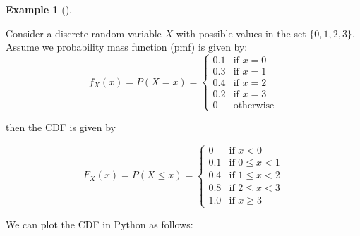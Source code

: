 \documentclass[
  letterpaper,
  DIV=11,
  numbers=noendperiod]{scrreport}
\theoremstyle{definition}
\newtheorem{example}{Example}[chapter]
\theoremstyle{plain}
\theoremstyle{plain}
\theoremstyle{definition}
\theoremstyle{remark}
\begin{document}
\begin{tcolorbox}[enhanced jigsaw, opacitybacktitle=0.6, bottomtitle=1mm, opacityback=0, toprule=.15mm, colbacktitle=quarto-callout-note-color!10!white, colback=white, left=2mm, title={CDF of a discrete random variable}, breakable, rightrule=.15mm, leftrule=.75mm, titlerule=0mm, colframe=quarto-callout-note-color-frame, arc=.35mm, coltitle=black, toptitle=1mm, bottomrule=.15mm]

\begin{example}[]\protect\hypertarget{exm-cdf-discrete}{}\label{exm-cdf-discrete}

Consider a discrete random variable \(X\) with possible values in the
set \(\{0, 1, 2, 3\}\). Assume we probability mass function (pmf) is
given by: \[
f_X(x) = P(X=x) =
\begin{cases}
0.1 & \text{if } x = 0 \\
0.3 & \text{if } x = 1 \\
0.4 & \text{if } x = 2 \\
0.2 & \text{if } x = 3 \\
0 & \text{otherwise}
\end{cases}
\]

then the CDF is given by

\[
F_X(x) = P(X \le x) = 
\begin{cases}
0 & \text{if } x < 0 \\
0.1 & \text{if } 0 \le x < 1 \\
0.4 & \text{if } 1 \le x < 2 \\
0.8 & \text{if } 2 \le x < 3 \\
1.0 & \text{if } x \ge 3
\end{cases}
\]

\end{example}

\end{tcolorbox}

We can plot the CDF in Python as follows:
\end{document}

